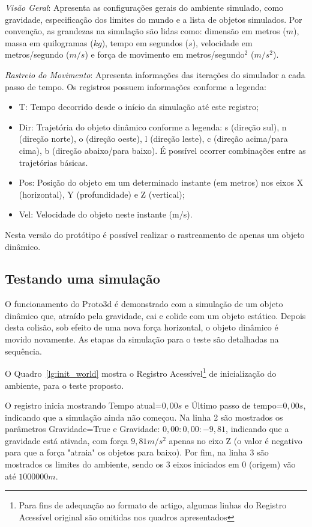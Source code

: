 \documentclass[12pt]{article}
\begin{document}
\emph{Visão Geral}: Apresenta as configurações gerais do ambiente simulado, como gravidade, especificação dos limites do mundo e a lista de objetos simulados. Por convenção, as grandezas na simulação são lidas como: dimensão em metros ($m$), massa em quilogramas ($kg$), tempo em segundos ($s$), velocidade em metros/segundo ($m/s$) e força de movimento em metros/segundo$^{2}$ ($m/s^{2}$).

\emph{Rastreio do Movimento}: Apresenta informações das iterações do simulador a cada passo de tempo. Os registros possuem informações conforme a legenda:

\begin{itemize}
	\item T: Tempo decorrido desde o início da simulação até este registro;
	\item Dir: Trajetória do objeto dinâmico conforme a legenda: s (direção sul), n (direção norte), o (direção oeste), l (direção leste), c (direção acima/para cima), b (direção abaixo/para baixo). É possível ocorrer combinações entre as trajetórias básicas. 
	\item Pos: Posição do objeto em um determinado instante (em metros) nos eixos X (horizontal), Y (profundidade) e Z (vertical);
	\item Vel: Velocidade do objeto neste instante (m/s).
\end{itemize}

Nesta versão do protótipo é possível realizar o rastreamento de apenas um objeto dinâmico.

\subsection{Testando uma simulação}
O funcionamento do Proto3d é demonstrado com a simulação de um objeto dinâmico que, atraído pela gravidade, cai e colide com um objeto estático. Depois desta colisão, sob efeito de uma nova força horizontal, o objeto dinâmico é movido novamente. As etapas da simulação para o teste são detalhadas na sequência. 

O Quadro~\ref{lg:init_world} mostra o Registro Acessível\footnote{Para fins de adequação ao formato de artigo, algumas linhas do Registro Acessível original são omitidas nos quadros apresentados} de inicialização do ambiente, para o teste proposto.

O registro inicia mostrando Tempo atual=$0,00s$ e Último passo de tempo=$0,00s$, indicando que a simulação ainda não começou. Na linha 2 são mostrados os parâmetros Gravidade=True e Gravidade: $0,00:0,00:-9,81$, indicando que a gravidade está ativada, com força $9,81 m/s^{2}$ apenas no eixo Z (o valor é negativo para que a força "atraia" os objetos para baixo). Por fim, na linha 3 são mostrados os limites do ambiente, sendo os 3 eixos iniciados em $0$ (origem) vão até $1000000m$.
\end{document}
